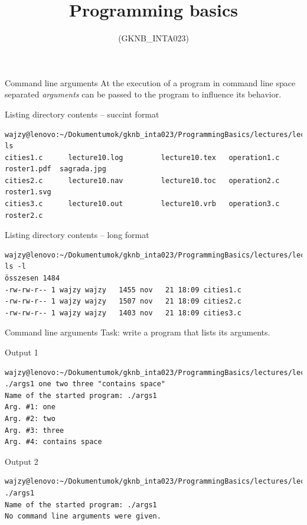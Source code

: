 \documentclass[usenames,dvipsnames,aspectratio=169]{beamer}
\title[Lecture 13.]{Programming basics}
\subtitle{(GKNB\_INTA023)}
\begin{document}
\begin{frame}[plain]
  \titlepage
\end{frame}

\begin{frame}[fragile]{Command line arguments}
  At the execution of a program in command line space separated \emph{arguments} can be passed to the program to influence its behavior.
  \begin{block}{Listing directory contents -- succint format}
    \fontsize{7}{8} \selectfont
    \begin{verbatim}
wajzy@lenovo:~/Dokumentumok/gknb_inta023/ProgrammingBasics/lectures/lecture10$ ls
cities1.c      lecture10.log         lecture10.tex   operation1.c  roster1.pdf  sagrada.jpg
cities2.c      lecture10.nav         lecture10.toc   operation2.c  roster1.svg
cities3.c      lecture10.out         lecture10.vrb   operation3.c  roster2.c   
\end{verbatim}
  \end{block}
  \begin{block}{Listing directory contents -- long format}
    \fontsize{7}{8} \selectfont
    \begin{verbatim}
wajzy@lenovo:~/Dokumentumok/gknb_inta023/ProgrammingBasics/lectures/lecture10$ ls -l
összesen 1484
-rw-rw-r-- 1 wajzy wajzy   1455 nov   21 18:09 cities1.c
-rw-rw-r-- 1 wajzy wajzy   1507 nov   21 18:09 cities2.c
-rw-rw-r-- 1 wajzy wajzy   1403 nov   21 18:09 cities3.c      
\end{verbatim}
  \end{block}
\end{frame}

\begin{frame}[fragile]{Command line arguments}
  Task: write a program that lists its arguments.
  \begin{block}{Output 1}
    \scriptsize
    \begin{verbatim}
wajzy@lenovo:~/Dokumentumok/gknb_inta023/ProgrammingBasics/lectures/lecture13$ 
./args1 one two three "contains space"
Name of the started program: ./args1
Arg. #1: one
Arg. #2: two
Arg. #3: three
Arg. #4: contains space
\end{verbatim}
  \end{block}
  \begin{block}{Output 2}
    \scriptsize
    \begin{verbatim}
wajzy@lenovo:~/Dokumentumok/gknb_inta023/ProgrammingBasics/lectures/lecture13$ ./args1
Name of the started program: ./args1
No command line arguments were given.
\end{verbatim}
  \end{block}
\end{frame}
\end{document}
